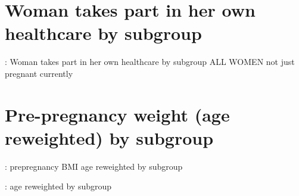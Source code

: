 \documentclass{article}
\begin{document}
\section{Woman takes part in her own healthcare by subgroup}

\begin{table}[H]
    \centering
    \setlength{\tabcolsep}{4pt} %
    \footnotesize %
    \caption{: Woman takes part in her own healthcare by subgroup ALL WOMEN not just pregnant currently}
    \label{tab:sumstat}
    \begin{adjustbox}{width=\textwidth}
        
    \end{adjustbox}
\end{table}

\section{Pre-pregnancy weight (age reweighted) by subgroup}

\begin{table}[H]
    \centering
    \setlength{\tabcolsep}{4pt} %
    \footnotesize %
    \caption{: prepregnancy BMI age reweighted by subgroup}
    \label{tab:sumstat}
    \begin{adjustbox}{width=\textwidth}
        
    \end{adjustbox}
\end{table}

\begin{table}[H]
    \centering
    \setlength{\tabcolsep}{4pt} %
    \footnotesize %
    \caption{:  age reweighted by subgroup}
    \label{tab:sumstat}
    \begin{adjustbox}{width=\textwidth}
        
    \end{adjustbox}
\end{table}
\end{document}
